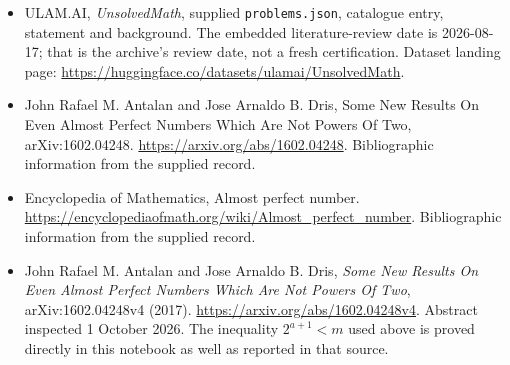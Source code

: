 \documentclass[11pt,a4paper]{article}
\begin{document}
{\small

\begin{itemize}

\item[\hypertarget{source:statement:1}{S1}] ULAM.AI, \emph{UnsolvedMath}, supplied \texttt{problems.json}, catalogue entry, statement and background. The embedded literature-review date is 2026-08-17; that is the archive’s review date, not a fresh certification. Dataset landing page: \url{https://huggingface.co/datasets/ulamai/UnsolvedMath}.

\item[\hypertarget{source:statement:2}{S2}] John Rafael M. Antalan and Jose Arnaldo B. Dris, Some New Results On Even Almost Perfect Numbers Which Are Not Powers Of Two, arXiv:1602.04248. \url{https://arxiv.org/abs/1602.04248}. Bibliographic information from the supplied record.

\item[\hypertarget{source:statement:3}{S3}] Encyclopedia of Mathematics, Almost perfect number. \url{https://encyclopediaofmath.org/wiki/Almost_perfect_number}. Bibliographic information from the supplied record.


\item[E1] John Rafael M. Antalan and Jose Arnaldo B. Dris,
\emph{Some New Results On Even Almost Perfect Numbers Which Are Not
Powers Of Two}, arXiv:1602.04248v4 (2017).
\url{https://arxiv.org/abs/1602.04248v4}. Abstract inspected
1 October 2026. The inequality $2^{a+1}<m$ used above is proved
directly in this notebook as well as reported in that source.

\end{itemize}

}

\label{end:statement}
\end{document}
